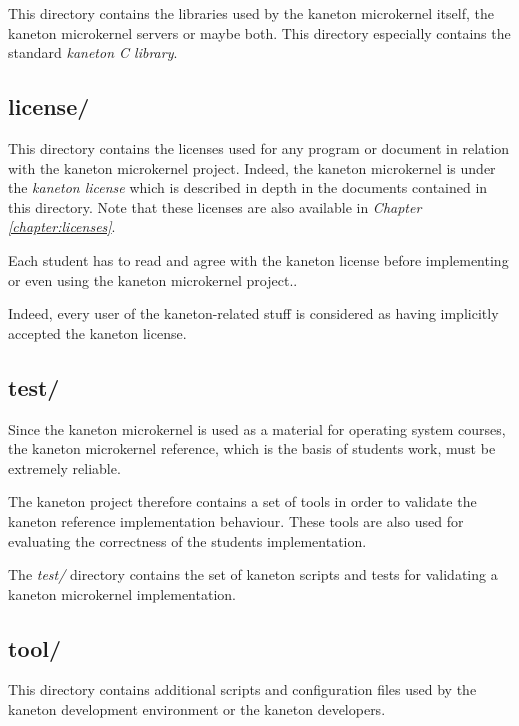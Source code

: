 This directory contains the libraries used by the kaneton microkernel itself,
the kaneton microkernel servers or maybe both. This directory especially
contains the standard \textit{kaneton C library}.

%
%

\subsection*{license/}

This directory contains the licenses used for any program or document
in relation with the kaneton microkernel project. Indeed, the kaneton
microkernel is under the \textit{kaneton license} which is described in
depth in the documents contained in this directory. Note that these licenses
are also available in \textit{Chapter \ref{chapter:licenses}}.

Each student has to read and agree with the kaneton license before
implementing or even using the kaneton microkernel project..

Indeed, every user of the kaneton-related stuff is considered as having
implicitly accepted the kaneton license.

%
%

\subsection*{test/}

Since the kaneton microkernel is used as a material for operating system
courses, the kaneton microkernel reference, which is the basis of students
work, must be extremely reliable.

The kaneton project therefore contains a set of tools in order to validate
the kaneton reference implementation behaviour. These tools are also used
for evaluating the correctness of the students implementation.

The \textit{test/} directory contains the set of kaneton scripts and tests
for validating a kaneton microkernel implementation.

%
%

\subsection*{tool/}

This directory contains additional scripts and configuration files used by
the kaneton development environment or the kaneton developers.

